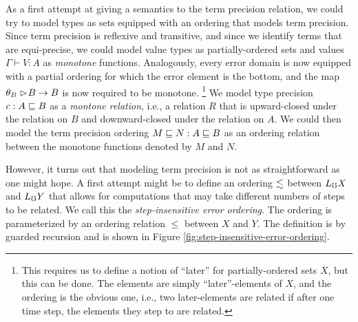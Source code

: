 As a first attempt at giving a semantics to the term precision relation, we
could try to model types as sets equipped with an ordering that models term
precision. Since term precision is reflexive and transitive, and since we
identify terms that are equi-precise, we could model value types as
partially-ordered sets and values $\Gamma \vdash V : A$ as \emph{monotone}
functions. Analogously, every error domain is now equipped with a partial
ordering for which the error element is the bottom, and the map $\theta_B
\vartriangleright \hspace{-0.2em} B \to B$ is now required to be monotone. 
%
\footnote{This requires us to define a notion of ``later'' for partially-ordered
sets $X$, but this can be done. The elements are simply ``later''-elements of
$X$, and the ordering is the obvious one, i.e., two later-elements are related
if after one time step, the elements they step to are related.}
%
%
We model type precision $c : A \sqsubseteq B$ as a \emph{montone relation}, i.e., a
relation $R$ that is upward-closed under the relation on $B$ and downward-closed
under the relation on $A$. We could then model the term precision ordering $M
\sqsubseteq N : A \sqsubseteq B$ as an ordering relation between the monotone functions
denoted by $M$ and $N$.

However, it turns out that modeling term precision is not as straightforward as
one might hope. A first attempt might be to define an ordering $\lesssim$
between $L_\mho X$ and $L_\mho Y$ that allows for computations that may take different
numbers of steps to be related. We call this the \emph{step-insensitive error
ordering}. The ordering is parameterized by an ordering relation $\le$ between
$X$ and $Y$. The definition is by guarded recursion and is shown in Figure
\ref{fig:step-insensitive-error-ordering}.

